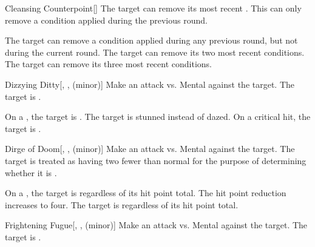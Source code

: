 {            \begin{freeability}{Cleansing Counterpoint}[]
                The target can remove its most recent .
                This can only remove a condition applied during the previous round.

                \rankline
                 The target can remove a condition applied during any previous round, but not during the current round.
                 The target can remove its two most recent conditions.
                 The target can remove its three most recent conditions.
            \end{freeability}

            \begin{freeability}{Dizzying Ditty}[, ,  (minor)]
                Make an attack vs. Mental against the target.
                \hit The target is .

                \rankline
                 On a , the target is .
                 The target is stunned instead of dazed.
                 On a critical hit, the target is .
            \end{freeability}

            \begin{freeability}{Dirge of Doom}[, ,  (minor)]
                Make an attack vs. Mental against the target.
                \hit The target is treated as having two fewer  than normal for the purpose of determining whether it is .

                \rankline
                 On a , the target is  regardless of its hit point total.
                 The hit point reduction increases to four.
                 The target is  regardless of its hit point total.
            \end{freeability}

            \begin{freeability}{Frightening Fugue}[, ,  (minor)]
                Make an attack vs. Mental against the target.
                \hit The target is .


\end{freeability}}
